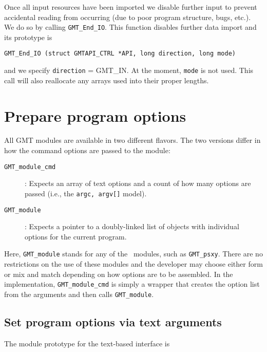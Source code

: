 \documentclass{report}
\begin{document}
Once all input resources have been imported we disable further input to prevent accidental
reading from occurring (due to poor program structure, bugs, etc.).  We do so by calling \texttt{GMT\_End\_IO}.  This
function disables further data import and its prototype is

\begin{verbatim}
GMT_End_IO (struct GMTAPI_CTRL *API, long direction, long mode)
\end{verbatim}

and we specify \texttt{direction} = GMT\_IN.  At the moment, \texttt{mode} is not used.  This call
will also reallocate any arrays used into their proper lengths.

\section{Prepare program options}
\label{sec:func}
All GMT modules  are available in two different flavors.
The two versions differ in how the command options are passed to the module:
\begin{description}
\item [\texttt{GMT\_module\_cmd}]: Expects an array of text options and a count of
how many options are passed (i.e., the \texttt{argc, argv[]} model).
\item [\texttt{GMT\_module}]: Expects a pointer to a doubly-linked list of objects with individual options
for the current program.
\end{description}
Here, \texttt{GMT\_module} stands for any of the \GMT\ modules, such as \texttt{GMT\_psxy}.
There are no restrictions on the use of these modules and the developer may choose
either form or mix and match depending on how options are to be assembled.  In the implementation,
\texttt{GMT\_module\_cmd} is simply a wrapper that creates the option list from the arguments and then
calls \texttt{GMT\_module}.

\subsection{Set program options via text arguments}
The module prototype for the text-based interface is
\end{document}
